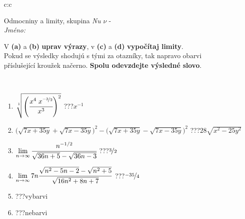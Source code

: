 \documentclass[10pt]{report}
\begin{document}
\newpage
\thispagestyle{empty}
\begin{tabular}{c:c}
\begin{minipage}[c][104.5mm][t]{0.5\linewidth}
\begin{center}
\vspace{7mm}
{\huge Odmocniny a limity, skupina \textit{Nu $\nu$} -}\\[5mm]
\textit{Jméno:}\phantom{xxxxxxxxxxxxxxxxxxxxxxxxxxxxxxxxxxxxxxxxxxxxxxxxxxxxxxxxxxxxxxxxx}\\[5mm]
\begin{minipage}{0.95\linewidth}
\begin{center}
V \textbf{(a)} a \textbf{(b)} \textbf{uprav výrazy}, v \textbf{(c)} a \textbf{(d)} \textbf{vypočítaj limity}.\\Pokud se výsledky shodujú s tými za otazníky, tak napravo obarvi\\příslušející kroužek načerno. \textbf{Spolu odevzdejte výsledné slovo}.
\end{center}
\end{minipage}
\\[1mm]
\begin{minipage}{0.79\linewidth}
\begin{center}
\begin{varwidth}{\linewidth}
\begin{enumerate}
\small
\item $\sqrt[1]{\left(\cfrac{x^{4}\;x^{\nicefrac{-3}{2}}}{x^{3}}\right)^{2}}$\quad \dotfill\; ???\;\dotfill \quad $x^{-1}$
\item {\footnotesize{\scriptsize$\big(\sqrt{7x+35y}+\sqrt{7x-35y}\big)^2-\big(\sqrt{7x+35y}-\sqrt{7x-35y}\big)^2$}\quad \dotfill\; ???\;\dotfill \quad $28\sqrt{x^2-25y^2}$}
\item $\lim\limits_{n\to\infty}\cfrac{n^{-1/2}}{\sqrt{36n+5}-\sqrt{36n-3}}$\quad \dotfill\; ???\;\dotfill \quad $\nicefrac{3}{2}$
\item $\lim\limits_{n\to\infty}7n\cfrac{\sqrt{n^2-5n-2}-\sqrt{n^2+5}}{\sqrt{16n^2+8n+7}}$\quad \dotfill\; ???\;\dotfill \quad $\nicefrac{-35}{4}$
\item \quad \dotfill\; ???\;\dotfill \quad vybarvi
\item \quad \dotfill\; ???\;\dotfill \quad nebarvi
\end{enumerate}
\end{varwidth}
\end{center}
\end{minipage}
\begin{minipage}{0.20\linewidth}

\end{minipage}
\end{center}
\end{minipage}
\end{tabular}
\end{document}
